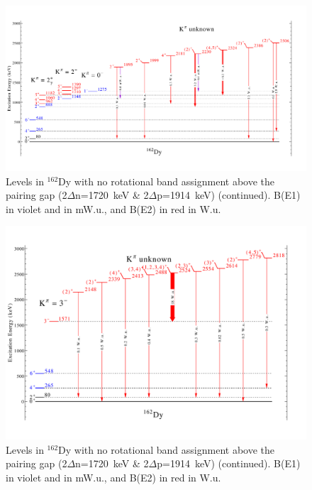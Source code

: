 \begin{landscape}
\begin{figure}[h!]
\begin{center}
\includegraphics[height=0.85\textheight]{figures/162Dy_misc2.pdf}
\end{center}
\caption{Levels in $^{162}$Dy with no rotational band assignment above the pairing gap (2$\Delta$n=1720~keV \& 2$\Delta$p=1914~keV) (continued). B(E1) in violet and in mW.u., and B(E2) in red in W.u. \label{fig:162Dy_misc2}}
\end{figure}
\end{landscape}

\begin{landscape}
\begin{figure}[h!]
\begin{center}
\includegraphics[height=0.85\textheight]{figures/162Dy_misc3.pdf}
\end{center}
\caption{Levels in $^{162}$Dy with no rotational band assignment above the pairing gap (2$\Delta$n=1720~keV \& 2$\Delta$p=1914~keV) (continued). B(E1) in violet and in mW.u., and B(E2) in red in W.u. \label{fig:162Dy_misc}}
\end{figure}
\end{landscape}


